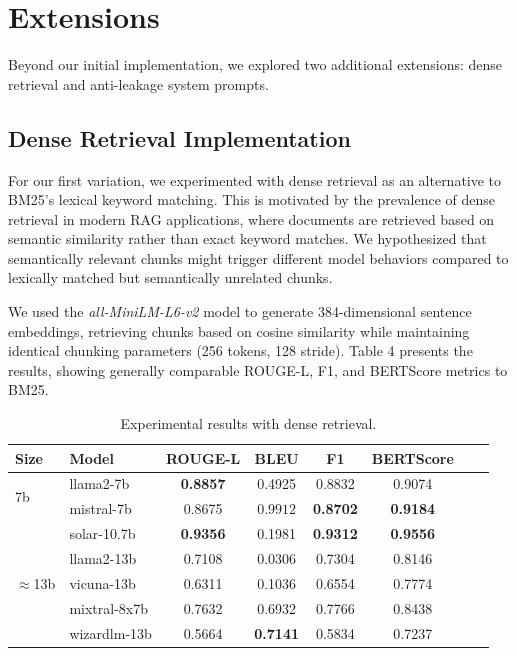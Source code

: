 \documentclass[10pt,letterpaper]{article}
\begin{document}
\section{Extensions}
Beyond our initial implementation, we explored two additional extensions: dense retrieval and anti-leakage system prompts.

\subsection{Dense Retrieval Implementation}
For our first variation, we experimented with dense retrieval as an alternative to BM25's lexical keyword matching. This is motivated by the prevalence of dense retrieval in modern RAG applications, where documents are retrieved based on semantic similarity rather than exact keyword matches. We hypothesized that semantically relevant chunks might trigger different model behaviors compared to lexically matched but semantically unrelated chunks.

We used the \textit{all-MiniLM-L6-v2} model to generate 384-dimensional sentence embeddings, retrieving chunks based on cosine similarity while maintaining identical chunking parameters (256 tokens, 128 stride). Table 4 presents the results, showing generally comparable ROUGE-L, F1, and BERTScore metrics to BM25.

\begin{table}[ht]
\centering
\small
\begin{tabular}{@{}llcccccc@{}}
\toprule
\textbf{Size} & \textbf{Model} & \textbf{ROUGE-L} & \textbf{BLEU} & \textbf{F1} & \textbf{BERTScore} \\
\midrule
\multirow{2}{*}{7b}
& llama2-7b & \textbf{0.8857} & 0.4925 & 0.8832 & 0.9074 \\
& mistral-7b & 0.8675 & $\mathbf{0.9912}$ & \textbf{0.8702} & \textbf{0.9184} \\
\midrule
\multirow{5}{*}{$\approx$13b}
& solar-10.7b & \textbf{0.9356} & 0.1981 & \textbf{0.9312} & \textbf{0.9556} \\
& llama2-13b & 0.7108 & 0.0306 & 0.7304 & 0.8146 \\
& vicuna-13b & 0.6311 & 0.1036 & 0.6554 & 0.7774 \\
& mixtral-8x7b & 0.7632 & 0.6932 & 0.7766 & 0.8438 \\
& wizardlm-13b & 0.5664 & \textbf{0.7141} & 0.5834 & 0.7237 \\
\bottomrule
\end{tabular}
\caption{Experimental results with dense retrieval.}
\label{tab:denser_retrieval_results}
\end{table}
\end{document}

